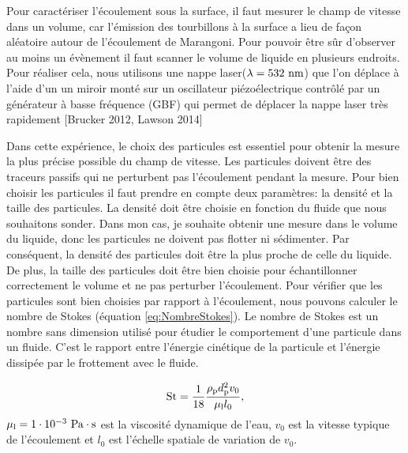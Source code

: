 \documentclass[french, 10pt]{article}
\begin{document}
Pour caractériser l'écoulement sous la surface, il faut mesurer le champ de vitesse dans un volume, car l'émission des tourbillons à la surface a lieu de façon aléatoire autour de l'écoulement de Marangoni.  Pour pouvoir être sûr d'observer au moins un évènement il faut scanner le volume de liquide en plusieurs endroits. Pour réaliser cela, nous utilisons une nappe laser($\lambda = 532 \rm ~ nm$) que l'on déplace à l'aide d'un un miroir monté sur un oscillateur piézoélectrique contrôlé par un générateur à basse fréquence (GBF) qui permet de déplacer la nappe laser très rapidement [Brucker 2012, Lawson 2014]\medskip%

Dans cette expérience, le choix des particules est essentiel pour obtenir la mesure la plus précise possible du champ de vitesse. Les particules doivent être des traceurs passifs qui ne perturbent pas l'écoulement pendant la mesure. Pour bien choisir les particules il faut prendre en compte deux paramètres: la densité et la taille des particules. La densité doit être choisie en fonction du fluide que nous souhaitons sonder. Dans mon cas, je souhaite obtenir une mesure dans le volume du liquide, donc les particules ne doivent pas flotter ni sédimenter. Par conséquent, la densité des particules doit être la plus proche de celle du liquide. De plus, la taille des particules doit être bien choisie pour échantillonner correctement le volume et ne pas perturber l'écoulement. Pour vérifier que les particules sont bien choisies par rapport à l'écoulement, nous pouvons calculer le nombre de Stokes (équation \ref{eq:NombreStokes}). Le nombre de Stokes est un nombre sans dimension utilisé pour étudier le comportement d'une particule dans un fluide. C'est le rapport entre l'énergie cinétique de la particule et l'énergie dissipée par le frottement avec le fluide.


    \begin{equation}
      \mathrm{St} = \frac{1}{18}\frac{\rho_{\rm p}d_{\rm p}^2v_0}{\mu_{\rm l}l_0},\label{eq:NombreStokes}
    \end{equation}
    $\mu_{\rm l} = 1\cdot 10^{-3}~\rm Pa\cdot s$ est la viscosité dynamique de l'eau, $v_0$ est la vitesse typique de l'écoulement et $l_0$ est l'échelle spatiale de variation de $v_0$.
\end{document}
